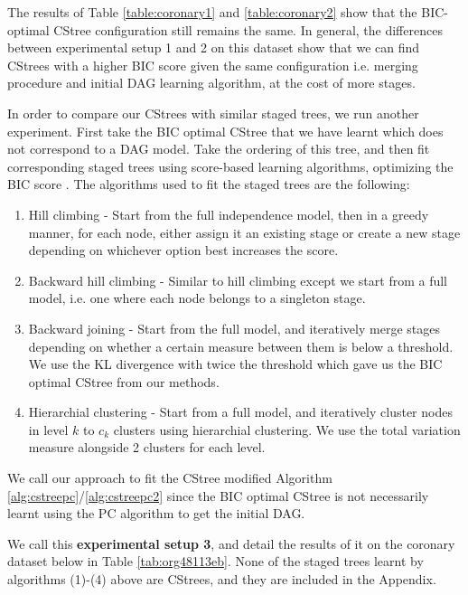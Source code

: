 \documentclass{tufte-book}
\begin{document}
The results of Table \ref{table:coronary1} and \ref{table:coronary2} show that the BIC-optimal CStree configuration still remains the same. In general, the differences between experimental setup 1 and 2 on this dataset show that we can find CStrees with a higher BIC score given the same configuration i.e. merging procedure and initial DAG learning algorithm, at the cost of more stages.




In order to compare our CStrees with similar staged trees, we run another experiment. First take the BIC optimal CStree that we have learnt which does not correspond to a DAG model. Take the ordering of this tree, and then fit corresponding staged trees using score-based learning algorithms, optimizing the BIC score \cite{carli-2020-r-packag}. The algorithms used to fit the staged trees are the following:


\begin{enumerate}
\item Hill climbing - Start from the full independence model, then in a greedy manner, for each node, either assign it an existing stage or create a new stage depending on whichever option best increases the score.
\item Backward hill climbing - Similar to hill climbing except we start from a full model, i.e. one where each node belongs to a singleton stage.
\item Backward joining - Start from the full model, and iteratively merge stages depending on whether a certain measure between them is below a threshold. We use the KL divergence with twice the threshold which gave us the BIC optimal CStree from our methods.
\item Hierarchial clustering - Start from a full model, and iteratively cluster nodes in level \(k\) to \(c_k\) clusters using hierarchial clustering. We use the total variation measure alongside 2 clusters for each level.
\end{enumerate}



We call our approach to fit the CStree modified Algorithm \ref{alg:cstreepc}/\ref{alg:cstreepc2} since the BIC optimal CStree is not necessarily learnt using the PC algorithm to get the initial DAG.

We call this \textbf{experimental setup 3}, and detail the results of it on the coronary dataset below in Table \ref{tab:org48113eb}. None of the staged trees learnt by algorithms (1)-(4) above are CStrees, and they are included in the Appendix.
\end{document}

